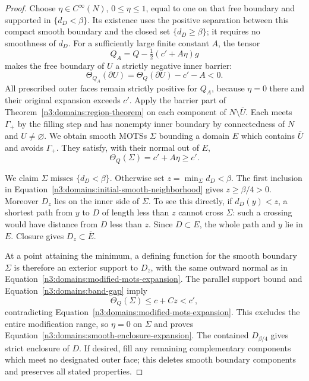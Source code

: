 \begin{proof}
Choose $\eta\in C^\infty(N)$, $0\leq\eta\leq1$, equal to one
on that free boundary and supported in $\{d_D<\beta\}$.  Its
existence uses the positive separation between this compact smooth
boundary and the closed set $\{d_D\geq\beta\}$; it requires no
smoothness of $d_D$.  For a sufficiently large finite constant $A$,
the tensor
\begin{equation}\label{n3:domains:modified-tensor}
 Q_A=Q-\tfrac12(c'+A\eta)g
\end{equation}
makes the free boundary of $U$ a strictly negative inner barrier:
\[
 \Theta_{Q_A}(\partial U)
       =\Theta_Q(\partial U)-c'-A<0.
\]
All prescribed outer faces remain strictly positive for $Q_A$,
because $\eta=0$ there and their original expansion exceeds $c'$.
Apply the barrier part of
Theorem~\ref{n3:domains:region-theorem} on each component of
$N\setminus\overline U$.  Each meets $\Gamma_+$ by the filling
step and has nonempty inner boundary by connectedness of $N$ and
$U\ne\varnothing$.  We obtain smooth MOTSs $\Sigma$ bounding a
domain $E$ which contains $\overline U$ and avoids $\Gamma_+$.
They satisfy, with their normal out of $E$,
\begin{equation}\label{n3:domains:modified-mots-expansion}
 \Theta_Q(\Sigma)=c'+A\eta\geq c'.
\end{equation}

We claim $\Sigma$ misses $\{d_D<\beta\}$.  Otherwise set
$z=\min_{\Sigma}d_D<\beta$.  The first inclusion in
Equation~\eqref{n3:domains:initial-smooth-neighborhood} gives
$z\geq\beta/4>0$.  Moreover $D_z$ lies on the inner side of
$\Sigma$.  To see this directly, if $d_D(y)<z$, a shortest path
from $y$ to $D$ of length less than $z$ cannot cross $\Sigma$:
such a crossing would have distance from $D$ less than $z$.
Since $D\subset E$, the whole path and $y$ lie in $E$.
Closure gives $D_z\subset\overline E$.

At a point attaining the minimum, a defining function for the
smooth boundary $\Sigma$ is therefore an exterior support to
$D_z$, with the same outward normal as in
Equation~\eqref{n3:domains:modified-mots-expansion}.  The parallel
support bound and Equation~\eqref{n3:domains:band-gap} imply
\[
 \Theta_Q(\Sigma)\leq c+Cz<c',
\]
contradicting Equation~\eqref{n3:domains:modified-mots-expansion}.
This excludes the entire modification range, so $\eta=0$ on
$\Sigma$ and proves Equation~\eqref{n3:domains:smooth-enclosure-expansion}.
The contained $D_{\beta/4}$ gives strict enclosure of $D$.
If desired, fill any remaining complementary components which meet
no designated outer face; this deletes smooth boundary components
and preserves all stated properties.
\end{proof}

